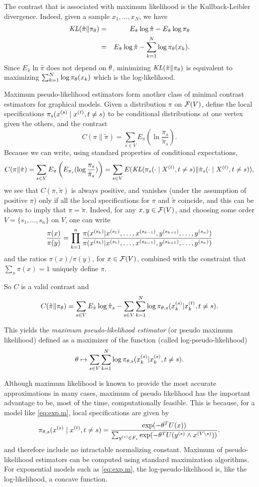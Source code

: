 The contrast that is associated with maximum likelihood is the
Kullback-Leibler divergence.
Indeed, given a sample $x_1, \ldots, x_N$, we have
\begin{eqnarray*}
\mathit{KL}(\hat \pi\|\pi_\theta) &=& E_{\hat \pi}\log\hat \pi - E_{\hat \pi} \log \pi_\theta\\
&=& E_{\hat \pi}\log\hat \pi - \sum_{k=1}^N \log \pi_\theta(x_k).
\end{eqnarray*}
Since $E_{\hat \pi}\ln\hat \pi$ does not depend on $\theta$, minimizing
$\mathit{KL}(\hat \pi\| \pi_\theta)$ is equivalent to maximizing $\sum_{k=1}^N \log
\pi_\theta(x_k)$ which is the log-likelihood.

Maximum pseudo-likelihood estimators form another class of minimal
contrast estimators for graphical models. Given a distribution $\pi$
on ${\mathcal F}(V)$, define the
local specifications
$\pi_{s}(x^{(s)}\mid x^{(t)}, t\neq s)$ to be conditional distributions at one
vertex given the others, and the contrast
\[
C(\pi\| \tilde \pi)  = \sum_{s\in V} E_\pi(\ln \frac{\pi_s}{\tilde \pi_s}).
\]
Because we can write, using standard properties of conditional expectations,
\[
C(\pi\| \tilde \pi) = \sum_{s\in V} E_\pi\left(E_{\pi_s}(\log
\frac{\pi_s}{\tilde \pi_s})\right) 
= \sum_{s\in V} E(\mathit{KL}(\pi_s(\cdot\mid X^{(t)},
t\neq s)\|\tilde \pi_s(\cdot \mid X^{(t)}, t\neq s)),
\]
we see that $C(\pi, \tilde\pi)$ is always positive, and vanishes (under the assumption
of positive $\pi$) only if all the local specifications for $\pi$ and
$\tilde\pi$ coincide, and this can be shown to imply that
$\pi=\tilde\pi$. Indeed, for any $x, y\in {\mathcal F}(V)$, and choosing some
order $V = \{s_1, \ldots, s_n\}$ on $V$, one can write
\[
\frac{\pi(x)}{\pi(y)} = \prod_{k=1}^n \frac{\pi(x^{(s_k)}|x^{(s_1)},
  \ldots, x^{(s_{k-1})}, y^{(s_{k+1})}, \ldots, y^{(s_n)})}
{\pi(x^{(s_k)}|x^{(s_1)},
  \ldots, x^{(s_{k-1})}, y^{(s_{k+1})}, \ldots, y^{(s_n)})}
\]
and the ratios $\pi(x)/\pi(y)$, for $x\in {\mathcal F}(V)$, combined with the constraint that $\sum_x\pi(x)=1$ uniquely
define $\pi$.

So $C$ is a valid contrast and 
\[
C(\hat\pi\| \pi_\theta) = \sum_{s\in V} E_{\hat\pi} \log \hat \pi_s -
\sum_{s\in V} \sum_{k=1}^N \log \pi_{\theta,s} (x_k^{(s)}|x_k^{(t)},
t\neq s).
\]

This yields the {\em maximum pseudo-likelihood estimator} (or
pseudo maximum likelihood) defined as
a maximizer of the function (called log-pseudo-likelihood)
$$
\theta \mapsto \sum_{s\in V} \sum_{k=1}^N \log \pi_{\theta,s} (x_k^{(s)}|x_k^{(s)},
t\neq s).
$$

Although maximum likelihood is known to provide the most accurate
approximations in many cases, maximum of pseudo likelihood has the
important advantage to be, most of the time, computationally
feasible. This is because, for a model like \cref{eq:exp.m}, local
specifications are given by 
$$
\pi_{\theta,s}(x^{(s)}\mid x^{(t)}, t\neq s) = \frac{\exp(-\theta^TU(x))}{\sum_{y^{(s)}\in
F_s} \exp(-\theta^T U(y^{(s)}\wedge x^{(V\setminus s)}))}.
$$
and therefore include no intractable normalizing constant. Maximum of
pseudo-likelihood estimators can be computed using standard
maximization algorithms. For exponential
models such as \cref{eq:exp.m}, the log-pseudo-likelihood is, like the
log-likelihood, a concave function.

